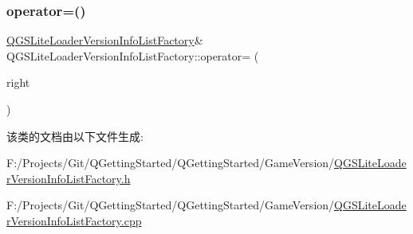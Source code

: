 \subsubsection{\texorpdfstring{operator=()}{operator=()}\hspace{0.1cm}{\footnotesize\ttfamily [2/2]}}
{\footnotesize\ttfamily \mbox{\hyperlink{class_q_g_s_lite_loader_version_info_list_factory}{Q\+G\+S\+Lite\+Loader\+Version\+Info\+List\+Factory}}\& Q\+G\+S\+Lite\+Loader\+Version\+Info\+List\+Factory\+::operator= (\begin{DoxyParamCaption}\item[{\mbox{\hyperlink{class_q_g_s_lite_loader_version_info_list_factory}{Q\+G\+S\+Lite\+Loader\+Version\+Info\+List\+Factory}} \&\&}]{right }\end{DoxyParamCaption})\hspace{0.3cm}{\ttfamily [delete]}}



该类的文档由以下文件生成\+:\begin{DoxyCompactItemize}
\item 
F\+:/\+Projects/\+Git/\+Q\+Getting\+Started/\+Q\+Getting\+Started/\+Game\+Version/\mbox{\hyperlink{_q_g_s_lite_loader_version_info_list_factory_8h}{Q\+G\+S\+Lite\+Loader\+Version\+Info\+List\+Factory.\+h}}\item 
F\+:/\+Projects/\+Git/\+Q\+Getting\+Started/\+Q\+Getting\+Started/\+Game\+Version/\mbox{\hyperlink{_q_g_s_lite_loader_version_info_list_factory_8cpp}{Q\+G\+S\+Lite\+Loader\+Version\+Info\+List\+Factory.\+cpp}}\end{DoxyCompactItemize}

